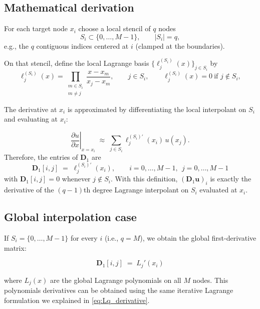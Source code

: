 \subsection*{Mathematical derivation}
For each target node \(x_i\) choose a local stencil of \(q\) nodes
\[
S_i \subset \{0,\dots,M-1\}, \qquad |S_i|=q,
\]
e.g., the \(q\) contiguous indices centered at \(i\) (clamped at the boundaries).

On that stencil, define the local Lagrange basis \(\{\ell^{(S_i)}_j(x)\}_{j\in S_i}\) by
\begin{equation}
\ell^{(S_i)}_j(x)
=
\prod_{\substack{m \in S_i\\ m\neq j}}
\frac{x - x_m}{x_j - x_m},
\qquad j\in S_i,
\qquad
\ell^{(S_i)}_j(x)=0 \ \text{if } j\notin S_i,
\end{equation}

The derivative at \(x_i\) is approximated by differentiating the local interpolant on \(S_i\)
and evaluating at \(x_i\):


\begin{equation}
\left.\frac{\partial u}{\partial x}\right|_{x=x_i}
\;\approx\;
\sum_{j\in S_i} \ell^{(S_i)\prime}_j(x_i)\,u(x_j).
\end{equation}
Therefore, the entries of \(\mathbf{D}_1\) are
\begin{equation}
\boxed{\;
\mathbf{D}_1[i,j] \;=\; \ell^{(S_i)\prime}_j(x_i),
\qquad i=0,\dots,M-1,\ \ j=0,\dots,M-1
\;}
\label{eq:D1_definition}
\end{equation}
with \(\mathbf{D}_1[i,j]=0\) whenever \(j\notin S_i\). With this definition,
\((\mathbf{D}_1\mathbf{u})_i\) is exactly the derivative of the \((q-1)\)th degree Lagrange
interpolant on \(S_i\) evaluated at \(x_i\).

\subsection*{Global interpolation case}

If \(S_i=\{0,\dots,M-1\}\) for every \(i\) (i.e., \(q=M\)), we obtain the global
first-derivative matrix:

\begin{equation}
\boxed{\;
\mathbf{D}_1[i,j] \;=\; L_j'(x_i)
\;}
\label{eq:D1_global_def}
\end{equation}

where \(L_j(x)\) are the global Lagrange polynomials on all \(M\) nodes. This polynomials derivatives can be obtained using the same iterative Lagrange formulation we explained in \eqref{eq:Lq_derivative}.

